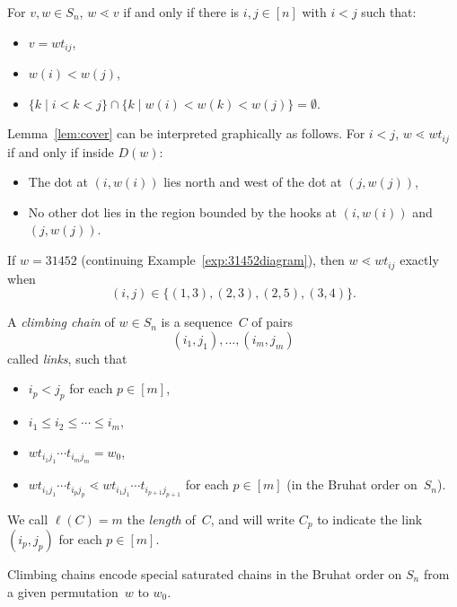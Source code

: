 \documentclass[ALCO]{cedram}
\begin{document}
\begin{lemma}
	\label{lem:cover}
	For $v,w\in S_n$, $w\lessdot v$ if and only if there is $i,j\in [n]$ with $i<j$ such that:
	\begin{itemize}
		\item $v=wt_{ij}$,
		\item $w(i)<w(j)$,
		\item $\{k \mid i<k<j\}\cap \{k\mid w(i)<w(k)<w(j) \}=\emptyset$.
	\end{itemize}
\end{lemma}

Lemma~\ref{lem:cover} can be interpreted graphically as follows. For $i<j$, $w\lessdot wt_{ij}$ if and only if inside $D(w)$:
\begin{itemize}
	\item The dot at $(i,w(i))$ lies north and west of the dot at $(j,w(j))$,
	\item No other dot lies in the region bounded by the hooks at $(i,w(i))$ and $(j,w(j))$.
\end{itemize}

\begin{example}
	If $w=31452$ (continuing Example~\ref{exp:31452diagram}), then $w\lessdot wt_{ij}$ exactly when 
	\[(i,j)\in \{(1,3),(2,3),(2,5),(3,4)\}.\]
\end{example}



\begin{definition}
	A \emph{climbing chain} of $w\in S_n$ is a sequence~$C$ of pairs 
	\[(i_1,j_1),\ldots,(i_m,j_m)\]
	called \emph{links}, such that 
	\begin{itemize}
		\item $i_p<j_p$ for each $p\in [m]$, 
		\item $i_1\leq i_2\leq \cdots \leq i_m$,
		\item $wt_{i_1j_1}\cdots t_{i_mj_m} = w_0$,
		\item $wt_{i_1j_1}\cdots t_{i_pj_p} \lessdot wt_{i_1j_1}\cdots t_{i_{p+1}j_{p+1}}$ for each $p\in [m]$ (in the Bruhat order on~$S_n$).
	\end{itemize}
	We call $\ell(C)=m$ the \emph{length} of~$C$, and will write $C_p$ to indicate the link $(i_p,j_p)$ for each $p\in [m]$.
\end{definition}
Climbing chains encode special saturated chains in the Bruhat order on $S_n$ from a given permutation~$w$ to $w_0$.
\end{document}
